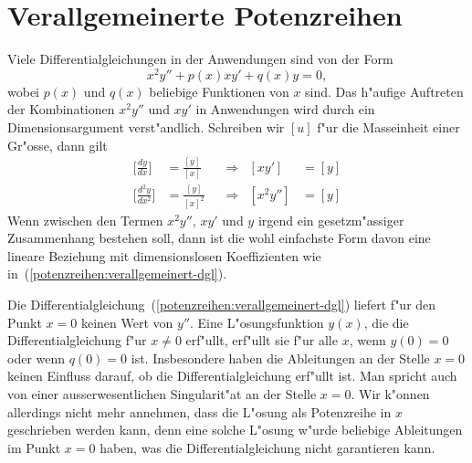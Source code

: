 \section{Verallgemeinerte Potenzreihen
\label{section:potenzreihen:verallgemeinert}}
Viele Differentialgleichungen in der Anwendungen sind von der Form
\begin{equation}
x^2y''+p(x)xy'+q(x)y=0,
\label{potenzreihen:verallgemeinert-dgl}
\end{equation}
wobei $p(x)$ und $q(x)$ beliebige Funktionen von $x$ sind.
Das h"aufige Auftreten der Kombinationen $x^2y''$ und $xy'$ in Anwendungen
wird durch ein Dimensionsargument verst"andlich.
Schreiben wir $[u]$ f"ur die Masseinheit einer Gr"osse, dann gilt
\begin{equation*}
\begin{aligned}
\biggl[\frac{dy}{dx}\biggr]
&=
\frac{[y]}{[x]}
&
&\Rightarrow&
[xy']&=[y]\\
\biggl[\frac{d^2y}{dx^2}\biggr]
&=
\frac{[y]}{[x]^2}
&
&\Rightarrow&
[x^2y'']&=[y]
\end{aligned}
\end{equation*}
Wenn zwischen den Termen $x^2y''$, $xy'$ und $y$ irgend ein
gesetzm"assiger Zusammenhang bestehen soll, dann ist die wohl
einfachste Form davon eine lineare Beziehung mit dimensionslosen
Koeffizienten wie in~(\ref{potenzreihen:verallgemeinert-dgl}).

Die Differentialgleichung~(\ref{potenzreihen:verallgemeinert-dgl})
liefert f"ur den Punkt $x=0$ keinen Wert von $y''$.
Eine L"osungsfunktion $y(x)$, die die Differentialgleichung f"ur
$x\ne 0$ erf"ullt, erf"ullt sie f"ur alle $x$, wenn $y(0)=0$ oder
wenn $q(0)=0$ ist. 
Insbesondere haben die Ableitungen an der Stelle $x=0$ keinen
Einfluss darauf, ob die Differentialgleichung erf"ullt ist.
Man spricht auch von einer ausserwesentlichen Singularit"at an
der Stelle $x=0$.
Wir k"onnen allerdings nicht mehr annehmen, dass die L"osung als
Potenzreihe in $x$ geschrieben werden kann, denn eine solche
L"osung w"urde beliebige Ableitungen im Punkt $x=0$ haben, was 
die Differentialgleichung nicht garantieren kann.

